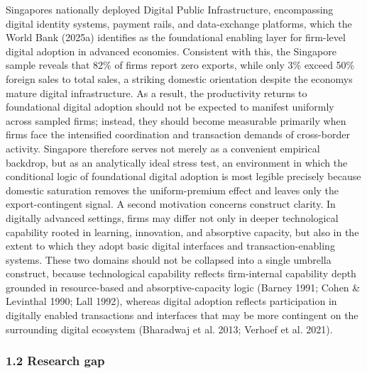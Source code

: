 \documentclass[12pt,a4paper]{article}
\begin{document}
Singapore\textquotesingle s nationally deployed Digital Public
Infrastructure, encompassing digital identity systems, payment rails,
and data-exchange platforms, which the World Bank (2025a) identifies as
the foundational enabling layer for firm-level digital adoption in
advanced economies. Consistent with this, the Singapore sample reveals
that 82\% of firms report zero exports, while only 3\% exceed 50\%
foreign sales to total sales, a striking domestic orientation despite
the economy\textquotesingle s mature digital infrastructure. As a
result, the productivity returns to foundational digital adoption should
not be expected to manifest uniformly across sampled firms; instead,
they should become measurable primarily when firms face the intensified
coordination and transaction demands of cross-border activity. Singapore
therefore serves not merely as a convenient empirical backdrop, but as
an analytically ideal stress test, an environment in which the
conditional logic of foundational digital adoption is most legible
precisely because domestic saturation removes the uniform-premium effect
and leaves only the export-contingent signal. A second motivation
concerns construct clarity. In digitally advanced settings, firms may
differ not only in deeper technological capability rooted in learning,
innovation, and absorptive capacity, but also in the extent to which
they adopt basic digital interfaces and transaction-enabling systems.
These two domains should not be collapsed into a single umbrella
construct, because technological capability reflects firm-internal
capability depth grounded in resource-based and absorptive-capacity
logic (Barney 1991; Cohen \& Levinthal 1990; Lall 1992), whereas digital
adoption reflects participation in digitally enabled transactions and
interfaces that may be more contingent on the surrounding digital
ecosystem (Bharadwaj et al. 2013; Verhoef et al. 2021).

\hypertarget{12-research-gap}{%
\subsubsection{1.2 Research gap}\label{12-research-gap}}
\end{document}
